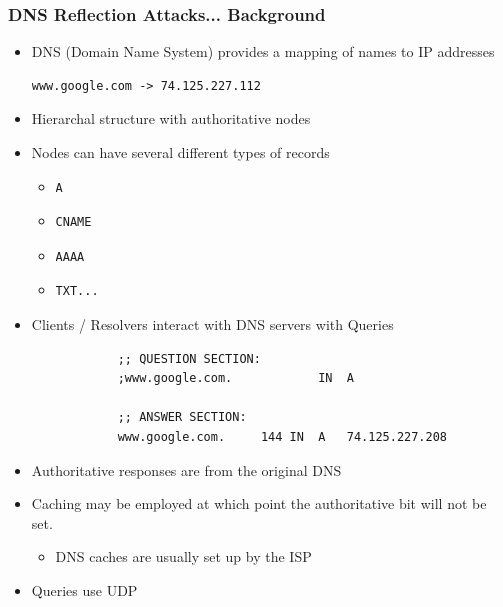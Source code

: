 \documentclass{beamer}
\begin{document}
\begin{frame}
	\frametitle{DNS Reflection Attacks... Background}
	\begin{itemize}
		\item DNS (Domain Name System) provides a mapping of names to IP addresses
			\begin{verbatim}www.google.com -> 74.125.227.112\end{verbatim}
		\item Hierarchal structure with authoritative nodes
		\item Nodes can have several different types of records
			\begin{itemize}
				\item \begin{verbatim}A\end{verbatim} %
				\item \begin{verbatim}CNAME\end{verbatim} 
				\item \begin{verbatim}AAAA\end{verbatim} 
				\item \begin{verbatim}TXT...\end{verbatim}
			\end{itemize}
		\item Clients / Resolvers interact with DNS servers with Queries
			\begin{lstlisting}
			;; QUESTION SECTION:
			;www.google.com.			IN	A

			;; ANSWER SECTION:
			www.google.com.		144	IN	A	74.125.227.208
			\end{lstlisting}
		\item Authoritative responses are from the original DNS
		\item Caching may be employed at which point the authoritative bit will not
			be set.
			\begin{itemize}
				\item DNS caches are usually set up by the ISP
			\end{itemize}
		\item Queries use UDP %
	\end{itemize}
\end{frame}
\end{document}
